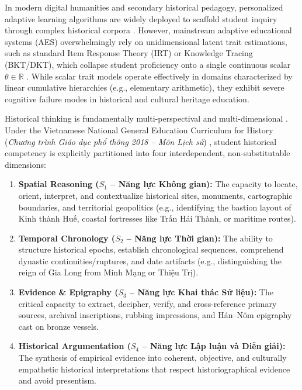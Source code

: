 \documentclass[11pt,a4paper]{article}
\begin{document}
In modern digital humanities and secondary historical pedagogy, personalized adaptive learning algorithms are widely deployed to scaffold student inquiry through complex historical corpora \cite{anderson2001taxonomy, vanlehn2006behavior}. However, mainstream adaptive educational systems (AES) overwhelmingly rely on unidimensional latent trait estimations, such as standard Item Response Theory (IRT) or Knowledge Tracing (BKT/DKT), which collapse student proficiency onto a single continuous scalar $\theta \in \mathbb{R}$ \cite{rasch1960probabilistic, piech2015deep}. While scalar trait models operate effectively in domains characterized by linear cumulative hierarchies (e.g., elementary arithmetic), they exhibit severe cognitive failure modes in historical and cultural heritage education.

Historical thinking is fundamentally multi-perspectival and multi-dimensional \cite{seixas2013big, van2008historical}. Under the Vietnamese National General Education Curriculum for History (\textit{Chương trình Giáo dục phổ thông 2018 -- Môn Lịch sử}) \cite{moet2018gdpt}, student historical competency is explicitly partitioned into four interdependent, non-substitutable dimensions:
\begin{enumerate}[label=\textbf{S\arabic*:}, leftmargin=2.5em]
    \item \textbf{Spatial Reasoning ($S_1$ -- Năng lực Không gian):} The capacity to locate, orient, interpret, and contextualize historical sites, monuments, cartographic boundaries, and territorial geopolitics (e.g., identifying the bastion layout of Kinh thành Huế, coastal fortresses like Trấn Hải Thành, or maritime routes).
    \item \textbf{Temporal Chronology ($S_2$ -- Năng lực Thời gian):} The ability to structure historical epochs, establish chronological sequences, comprehend dynastic continuities/ruptures, and date artifacts (e.g., distinguishing the reign of Gia Long from Minh Mạng or Thiệu Trị).
    \item \textbf{Evidence \& Epigraphy ($S_3$ -- Năng lực Khai thác Sử liệu):} The critical capacity to extract, decipher, verify, and cross-reference primary sources, archival inscriptions, rubbing impressions, and Hán--Nôm epigraphy cast on bronze vessels.
    \item \textbf{Historical Argumentation ($S_4$ -- Năng lực Lập luận và Diễn giải):} The synthesis of empirical evidence into coherent, objective, and culturally empathetic historical interpretations that respect historiographical evidence and avoid presentism.
\end{enumerate}
\end{document}

